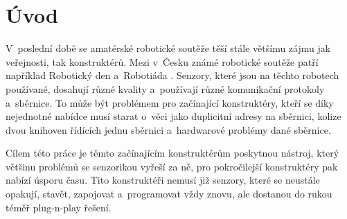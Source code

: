 \chapter*{Úvod}
V~poslední době se amatérské robotické soutěže těší stále většímu zájmu jak veřejnosti, tak konstruktérů.
Mezi v~Česku známé robotické soutěže patří například Robotický den \cite{Prague-robotic-day} a~Robotiáda \cite{Robotiada}.
Senzory, které jsou na těchto robotech používané, dosahují různé kvality a~používají různé komunikační protokoly a~sběrnice. To může být problémem pro začínající konstruktéry, kteří se díky nejednotné nabídce musí starat o~věci jako duplicitní adresy na sběrnici, kolize dvou knihoven řídících jednu sběrnici a~hardwarové problémy dané sběrnice.

Cílem této práce je těmto začínajícím konstruktérům poskytnou nástroj, který většinu problémů se senzorikou vyřeší za ně, pro pokročilejší konstruktéry pak nabízí úsporu času.
Tito konstruktéři nemusí již senzory, které se neustále opakují, stavět, zapojovat a~programovat vždy znovu, ale dostanou do rukou téměř plug-n-play řešení.


\newpage
